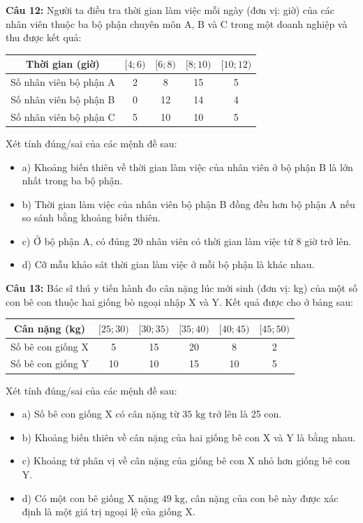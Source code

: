 \documentclass[12pt]{article}
\begin{document}
	\vspace{4mm}
	
	\noindent \textbf{Câu 12:} Người ta điều tra thời gian làm việc mỗi ngày (đơn vị: giờ) của các nhân viên thuộc ba bộ phận chuyên môn A, B và C trong một doanh nghiệp và thu được kết quả:
	\begin{center}
		\renewcommand{\arraystretch}{1.3}
		\begin{tabular}{|c|c|c|c|c|}
			\hline
			Thời gian (giờ) & $[4; 6)$ & $[6; 8)$ & $[8; 10)$ & $[10; 12)$ \\
			\hline
			Số nhân viên bộ phận A & 2 & 8 & 15 & 5 \\
			\hline
			Số nhân viên bộ phận B & 0 & 12 & 14 & 4 \\
			\hline
			Số nhân viên bộ phận C & 5 & 10 & 10 & 5 \\
			\hline
		\end{tabular}
	\end{center}
	Xét tính đúng/sai của các mệnh đề sau:
	\begin{itemize}[label=, leftmargin=*]
		\item a) Khoảng biến thiên về thời gian làm việc của nhân viên ở bộ phận B là lớn nhất trong ba bộ phận.
		\item b) Thời gian làm việc của nhân viên bộ phận B đồng đều hơn bộ phận A nếu so sánh bằng khoảng biến thiên.
		\item c) Ở bộ phận A, có đúng 20 nhân viên có thời gian làm việc từ 8 giờ trở lên.
		\item d) Cỡ mẫu khảo sát thời gian làm việc ở mỗi bộ phận là khác nhau.
	\end{itemize}
	
	\vspace{4mm}
	
	\noindent \textbf{Câu 13:} Bác sĩ thú y tiến hành đo cân nặng lúc mới sinh (đơn vị: kg) của một số con bê con thuộc hai giống bò ngoại nhập X và Y. Kết quả được cho ở bảng sau:
	\begin{center}
		\renewcommand{\arraystretch}{1.3}
		\begin{tabular}{|c|c|c|c|c|c|}
			\hline
			Cân nặng (kg) & $[25; 30)$ & $[30; 35)$ & $[35; 40)$ & $[40; 45)$ & $[45; 50)$ \\
			\hline
			Số bê con giống X & 5 & 15 & 20 & 8 & 2 \\
			\hline
			Số bê con giống Y & 10 & 10 & 15 & 10 & 5 \\
			\hline
		\end{tabular}
	\end{center}
	Xét tính đúng/sai của các mệnh đề sau:
	\begin{itemize}[label=, leftmargin=*]
		\item a) Số bê con giống X có cân nặng từ $35\text{ kg}$ trở lên là 25 con.
		\item b) Khoảng biến thiên về cân nặng của hai giống bê con X và Y là bằng nhau.
		\item c) Khoảng tứ phân vị về cân nặng của giống bê con X nhỏ hơn giống bê con Y.
		\item d) Có một con bê giống X nặng $49\text{ kg}$, cân nặng của con bê này được xác định là một giá trị ngoại lệ của giống X.
	\end{itemize}
	
\end{document}

